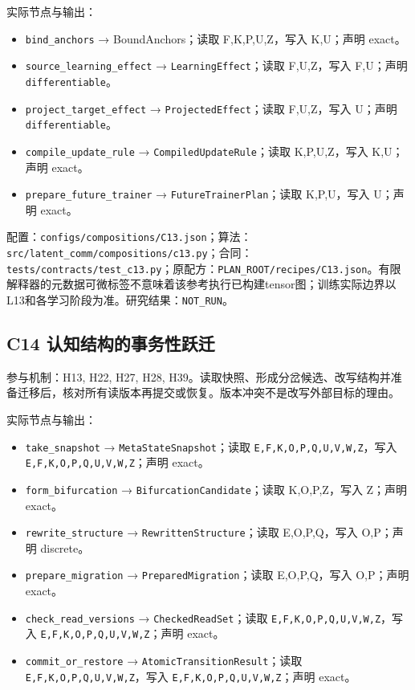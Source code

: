 \documentclass[
  10pt,
]{article}
\begin{document}
实际节点与输出：

\begin{itemize}
\item
  \nolinkurl{bind_anchors} → BoundAnchors；读取 F,K,P,U,Z，写入
  K,U；声明 exact。
\item
  \nolinkurl{source_learning_effect} → \nolinkurl{LearningEffect}；读取
  F,U,Z，写入 F,U；声明 \nolinkurl{differentiable}。
\item
  \nolinkurl{project_target_effect} → \nolinkurl{ProjectedEffect}；读取
  F,U,Z，写入 U；声明 \nolinkurl{differentiable}。
\item
  \nolinkurl{compile_update_rule} → \nolinkurl{CompiledUpdateRule}；读取
  K,P,U,Z，写入 K,U；声明 exact。
\item
  \nolinkurl{prepare_future_trainer} →
  \nolinkurl{FutureTrainerPlan}；读取 K,P,U，写入 U；声明 exact。
\end{itemize}

配置：{\small\nolinkurl{configs/compositions/C13.json}}；算法：{\small\nolinkurl{src/latent_comm/compositions/c13.py}}；合同：{\small\nolinkurl{tests/contracts/test_c13.py}}；原配方：{\small\nolinkurl{PLAN_ROOT/recipes/C13.json}}。有限解释器的元数据可微标签不意味着该参考执行已构建tensor图；训练实际边界以L13和各学习阶段为准。研究结果：\nolinkurl{NOT_RUN}。

\subsection{C14
认知结构的事务性跃迁}\label{c14-ux8ba4ux77e5ux7ed3ux6784ux7684ux4e8bux52a1ux6027ux8dc3ux8fc1}

参与机制：H13, H22, H27, H28,
H39。读取快照、形成分岔候选、改写结构并准备迁移后，核对所有读版本再提交或恢复。版本冲突不是改写外部目标的理由。

实际节点与输出：

\begin{itemize}
\item
  \nolinkurl{take_snapshot} → \nolinkurl{MetaStateSnapshot}；读取
  \nolinkurl{E,F,K,O,P,Q,U,V,W,Z}，写入
  \nolinkurl{E,F,K,O,P,Q,U,V,W,Z}；声明 exact。
\item
  \nolinkurl{form_bifurcation} → \nolinkurl{BifurcationCandidate}；读取
  K,O,P,Z，写入 Z；声明 exact。
\item
  \nolinkurl{rewrite_structure} → \nolinkurl{RewrittenStructure}；读取
  E,O,P,Q，写入 O,P；声明 discrete。
\item
  \nolinkurl{prepare_migration} → \nolinkurl{PreparedMigration}；读取
  E,O,P,Q，写入 O,P；声明 exact。
\item
  \nolinkurl{check_read_versions} → \nolinkurl{CheckedReadSet}；读取
  \nolinkurl{E,F,K,O,P,Q,U,V,W,Z}，写入
  \nolinkurl{E,F,K,O,P,Q,U,V,W,Z}；声明 exact。
\item
  \nolinkurl{commit_or_restore} →
  \nolinkurl{AtomicTransitionResult}；读取
  \nolinkurl{E,F,K,O,P,Q,U,V,W,Z}，写入
  \nolinkurl{E,F,K,O,P,Q,U,V,W,Z}；声明 exact。
\end{itemize}
\end{document}
